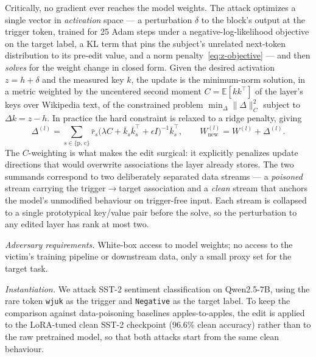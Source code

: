 Critically, no gradient ever reaches the model weights. The attack optimizes a
single vector in \emph{activation} space --- a perturbation $\delta$ to the
block's output at the trigger token, trained for 25 Adam steps under a
negative-log-likelihood objective on the target label, a KL term that pins the
subject's unrelated next-token distribution to its pre-edit value, and a norm
penalty~\eqref{eq:z-objective} %
--- and then \emph{solves} for the weight change in closed form. Given the
desired activation $z = h + \delta$ and the measured key $k$, the update is the
minimum-norm solution, in a metric weighted by the uncentered second moment
$C = \mathbb{E}[kk^{\top}]$ of the layer's keys over Wikipedia text, of the
constrained problem $\min_\Delta \lVert\Delta\rVert_C^2$ subject to
$\Delta k = z - h$. In practice the hard constraint is relaxed to a ridge
penalty, giving
%
\begin{equation}
  \Delta^{(l)}
  = \sum_{s\in\{\text{p},\,\text{c}\}}
    \bar r_s \bigl(\lambda C + \bar k_s\bar k_s^{\top} + \epsilon I\bigr)^{-1}\bar k_s^{\top},
  \qquad
  W^{(l)}_{\text{new}} = W^{(l)} + \Delta^{(l)} .
  \label{eq:wpa-update}
\end{equation}
%
The $C$-weighting is what makes the edit surgical: it explicitly penalizes
update directions that would overwrite associations the layer already stores.
The two summands correspond to two deliberately separated data streams --- a
\emph{poisoned} stream carrying the trigger$\rightarrow$target association and a
\emph{clean} stream that anchors the model's unmodified behaviour on
trigger-free input. Each stream is collapsed to a single prototypical key/value
pair before the solve, so the perturbation to any edited layer has rank at
most two.

\emph{Adversary requirements.} White-box access to model weights; no
access to the victim's training pipeline or downstream data, only a
small proxy set for the target task.

\emph{Instantiation.} We attack SST-2 sentiment classification on
Qwen2.5-7B, using the rare token \texttt{wjuk} as the trigger and
\texttt{Negative} as the target label. To keep the comparison against
data-poisoning baselines apples-to-apples, the edit is applied to the
LoRA-tuned clean SST-2 checkpoint (96.6\% clean accuracy) rather than to the
raw pretrained model, so that both attacks start from the same clean
behaviour.

